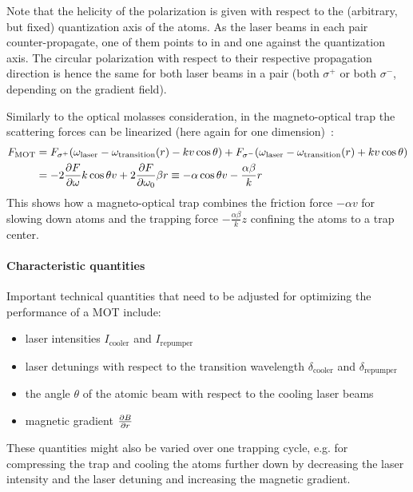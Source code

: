 Note that the helicity of the polarization is given with respect to the (arbitrary, but fixed) quantization axis of the atoms. As the laser beams in each pair counter-propagate, one of them points to in and one against the quantization axis. The circular polarization with respect to their respective propagation direction is hence the same for both laser beams in a pair (both $\sigma^+$ or both $\sigma^-$, depending on the gradient field).


Similarly to the optical molasses consideration, in the magneto-optical trap the scattering forces can be linearized  (here again for one dimension)~\cite{foot_atomic_2005}:
\begin{equation}
    \begin{split}
        F_\text{MOT} &= F_{\sigma^+}(\omega_\text{laser} - \omega_\text{transition}(r) - kv \cos \theta) + F_{\sigma^-}(\omega_\text{laser} - \omega_\text{transition}(r) + kv \cos \theta)\\
        &= -2 \pdv{F}{\omega} k\cos \theta v + 2 \pdv{F}{\omega_0} \beta r  \equiv - \alpha \cos \theta v - \frac{\alpha \beta}{k} r
    \end{split}
\end{equation}
This shows how a magneto-optical trap combines the friction force $- \alpha v$ for slowing down atoms and the trapping force $- \frac{\alpha \beta}{k} z$ confining the atoms to a trap center.


\paragraph{Characteristic quantities}
Important technical quantities that need to be adjusted for optimizing the performance of a MOT include:
\begin{itemize}
    \item laser intensities $I_\text{cooler}$ and $I_\text{repumper}$
    \item laser detunings with respect to the transition wavelength $\delta_\text{cooler}$ and $\delta_\text{repumper}$
    \item the angle $\theta$ of the atomic beam with respect to the cooling laser beams
    \item magnetic gradient $\pdv{B}{r}$
\end{itemize}

These quantities might also be varied over one trapping cycle, e.g. for compressing the trap and cooling the atoms further down by decreasing the laser intensity and the laser detuning and increasing the magnetic gradient.

